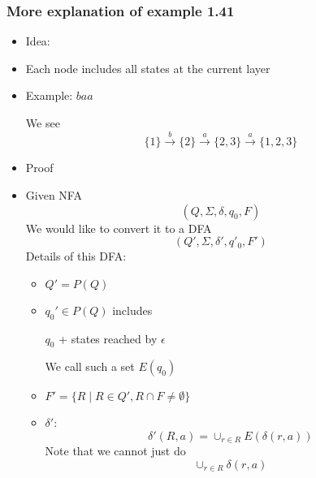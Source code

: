 \begin{frame}[allowframebreaks] \frametitle{More explanation
    of example 1.41}
\begin{itemize}

\item Idea: 

  
\item [] Each node includes all states at the current layer
  
\item Example: $baa$


  \begin{center}
\end{center}
We see
\begin{equation*}
  \{1\} \xrightarrow{b} \{2\} \xrightarrow{a} \{2, 3\}
  \xrightarrow{a} \{1, 2, 3\}
\end{equation*}
\item Proof
  \item[] Given NFA
    \begin{equation*}
(Q,\Sigma, \delta, q_0, F)
\end{equation*}
We would like to convert it to a DFA
\begin{equation*}
(Q', \Sigma, \delta', q'_0, F')
\end{equation*}
Details of this DFA:
\begin{itemize}
\item $Q'=P(Q)$
\item $q_0' \in P(Q)$ includes
  \begin{center}
 $q_0$ + states
reached by $\epsilon$
\end{center}
We call such a set $E(q_0)$
\item $F'=
\{R\mid R \in Q', R \cap F\neq \emptyset\}$
\item $\delta'$:
  \begin{equation*}
    \delta'(R,a)=
\cup_{r\in R} E(\delta(r,a))
\end{equation*}
Note that we cannot just do
\begin{equation*}
\cup_{r\in R}\delta(r,a)
\end{equation*}
\end{itemize}
\end{itemize}\end{frame}



